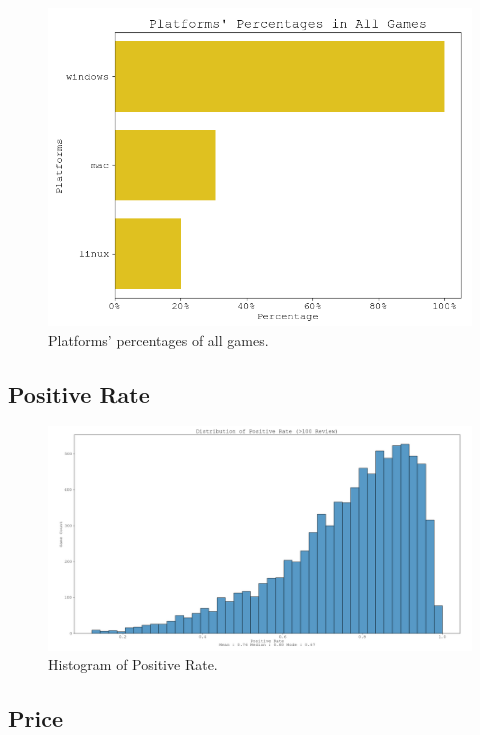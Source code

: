\documentclass[conference]{IEEEtran}
\begin{document}
\begin{figure}[h]
  \includegraphics[width=\linewidth]{assets/platforms_dist.png}
  \caption{Platforms' percentages of all games.}
  \label{fig:platform1}
\end{figure}


\subsection{Positive Rate}


\begin{figure}[h]
  \includegraphics[width=\linewidth]{assets/positive_rate_dist.png}
  \caption{Histogram of Positive Rate.}
  \label{fig:positiverate1}
\end{figure}


\subsection{Price}
\end{document}
